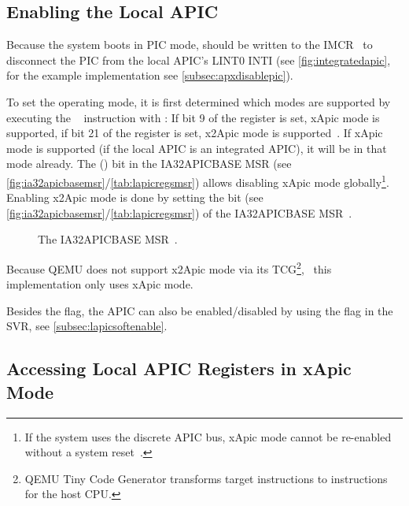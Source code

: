 \subsection{Enabling the Local APIC}
\label{subsec:lapicenable}

Because the system boots in PIC mode,  should be written to the IMCR~\autocite[sec.~3.6.2.1]{mpspec} to disconnect the PIC from the local APIC's LINT0 INTI (see \autoref{fig:integratedapic}, for the example implementation see \autoref{subsec:apxdisablepic}).

To set the operating mode, it is first determined which modes are supported by executing the ~\autocite{x86isa} instruction with : If bit 9 of the  register is set, xApic mode is supported, if bit 21 of the  register is set, x2Apic mode is supported~\autocite[sec.~5.1.2]{cpuid}.
If xApic mode is supported (if the local APIC is an integrated APIC), it will be in that mode already.
The  () bit in the IA32\textunderscore{}APIC\textunderscore{}BASE MSR (see \autoref{fig:ia32apicbasemsr}/\autoref{tab:lapicregsmsr}) allows disabling xApic mode globally\footnote{
  If the system uses the discrete APIC bus, xApic mode cannot be re-enabled without a system reset~\autocite[sec.~3.11.4.3]{ia32}.}.
Enabling x2Apic mode is done by setting the  bit (see \autoref{fig:ia32apicbasemsr}/\autoref{tab:lapicregsmsr}) of the IA32\textunderscore{}APIC\textunderscore{}BASE MSR~\autocite[sec.~3.11.4.3]{ia32}.

\begin{figure}[h]
  \centering
  \begin{subfigure}[b]{0.7\textwidth}
    
  \end{subfigure}
  \caption{The IA32\textunderscore{}APIC\textunderscore{}BASE MSR~\autocite[sec.~3.11.4.4]{ia32}.}
  \label{fig:ia32apicbasemsr}
\end{figure}

Because QEMU does not support x2Apic mode via its TCG\footnote{
  QEMU Tiny Code Generator transforms target instructions to instructions for the host CPU.},
\ this implementation only uses xApic mode.

Besides the  flag, the APIC can also be enabled/disabled by using the  flag in the SVR, see \autoref{subsec:lapicsoftenable}.

\subsection{Accessing Local APIC Registers in xApic Mode}
\label{subsec:xapicregacc}


